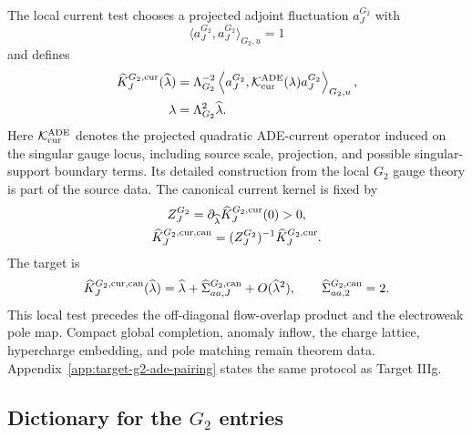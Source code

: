 The local current test chooses a projected adjoint fluctuation
\(a_J^{G_2}\) with
\begin{equation}
  \langle a_J^{G_2},a_J^{G_2}\rangle_{G_2,u}=1
  \label{eq:g2-current-unit-norm}
\end{equation}
and defines
\begin{equation}
  \begin{aligned}
  \widehat K_J^{G_2,{\rm cur}}(\widehat\lambda)
  &=
  \Lambda_{G_2}^{-2}
  \left\langle a_J^{G_2},
  \mathcal K_{\rm cur}^{\rm ADE}(\lambda)a_J^{G_2}
  \right\rangle_{G_2,u},
  \\
  \lambda&=\Lambda_{G_2}^2\widehat\lambda .
  \end{aligned}
  \label{eq:g2-current-kernel-normalization}
\end{equation}
Here \(\mathcal K_{\rm cur}^{\rm ADE}\) denotes the projected quadratic
ADE-current operator induced on the singular gauge locus, including source
scale, projection, and possible singular-support boundary terms.  Its detailed
construction from the local \(G_2\) gauge theory is part of the source data.
The canonical current kernel is fixed by
\begin{equation}
  \begin{gathered}
  Z_J^{G_2}
  =
  \partial_{\widehat\lambda}
  \widehat K_J^{G_2,{\rm cur}}(0)>0,
  \\
  \widehat K_J^{G_2,{\rm cur,can}}
  =
  (Z_J^{G_2})^{-1}\widehat K_J^{G_2,{\rm cur}} .
  \end{gathered}
  \label{eq:g2-current-canonical-factor}
\end{equation}
The target is
\begin{equation}
  \widehat K_J^{G_2,{\rm cur,can}}(\widehat\lambda)
  =
  \widehat\lambda+\widehat\Sigma_{aa,J}^{G_2,{\rm can}}
  +O(\widehat\lambda^2),
  \qquad
  \widehat\Sigma_{aa,2}^{G_2,{\rm can}}=2 .
  \label{eq:g2-current-entry-target}
\end{equation}
This local test precedes the off-diagonal flow-overlap product and the
electroweak pole map.  Compact global completion, anomaly inflow, the charge
lattice, hypercharge embedding, and pole matching remain theorem data.
Appendix~\ref{app:target-g2-ade-pairing} states the same protocol as Target
IIIg.

\subsection{Dictionary for the \texorpdfstring{$G_2$}{G2} entries}
\label{sec:g2-entry-dictionary}

